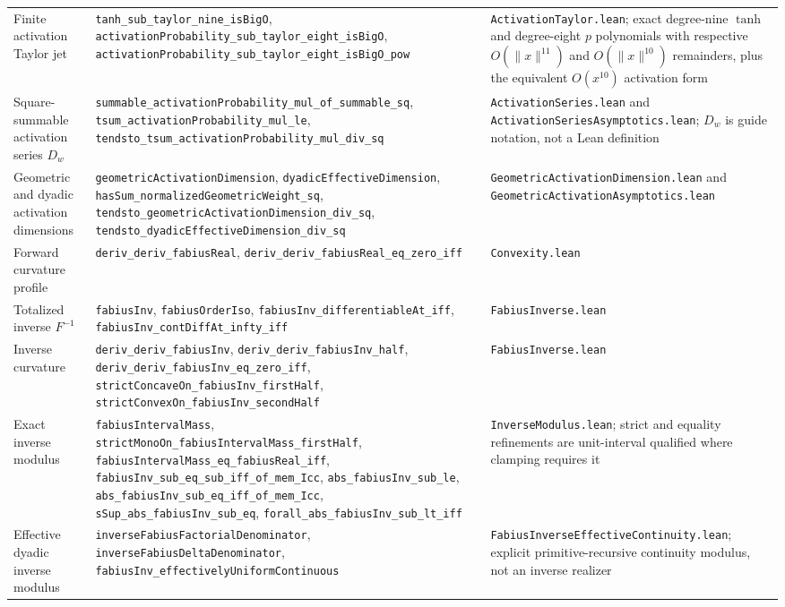 \documentclass[11pt,oneside]{article}
\theoremstyle{definition}
\theoremstyle{remark}
\begin{document}
\begin{longtable}{@{}>{\raggedright\arraybackslash}p{} >{\raggedright\arraybackslash}p{} >{\raggedright\arraybackslash}p{}@{}}
Finite activation Taylor jet & \nolinkurl{tanh_sub_taylor_nine_isBigO}, \nolinkurl{activationProbability_sub_taylor_eight_isBigO}, \nolinkurl{activationProbability_sub_taylor_eight_isBigO_pow} & \nolinkurl{ActivationTaylor.lean}; exact degree-nine \(\tanh\) and degree-eight \(p\) polynomials with respective \(O(\lVert x\rVert^{11})\) and \(O(\lVert x\rVert^{10})\) remainders, plus the equivalent \(O(x^{10})\) activation form \\
Square-summable activation series \(D_w\) & \nolinkurl{summable_activationProbability_mul_of_summable_sq}, \nolinkurl{tsum_activationProbability_mul_le}, \nolinkurl{tendsto_tsum_activationProbability_mul_div_sq} & \nolinkurl{ActivationSeries.lean} and \nolinkurl{ActivationSeriesAsymptotics.lean}; \(D_w\) is guide notation, not a Lean definition \\
Geometric and dyadic activation dimensions & \nolinkurl{geometricActivationDimension}, \nolinkurl{dyadicEffectiveDimension}, \nolinkurl{hasSum_normalizedGeometricWeight_sq}, \nolinkurl{tendsto_geometricActivationDimension_div_sq}, \nolinkurl{tendsto_dyadicEffectiveDimension_div_sq} & \nolinkurl{GeometricActivationDimension.lean} and \nolinkurl{GeometricActivationAsymptotics.lean} \\
Forward curvature profile & \nolinkurl{deriv_deriv_fabiusReal}, \nolinkurl{deriv_deriv_fabiusReal_eq_zero_iff} & \nolinkurl{Convexity.lean} \\
Totalized inverse \(F^{-1}\) & \nolinkurl{fabiusInv}, \nolinkurl{fabiusOrderIso}, \nolinkurl{fabiusInv_differentiableAt_iff}, \nolinkurl{fabiusInv_contDiffAt_infty_iff} & \nolinkurl{FabiusInverse.lean} \\
Inverse curvature & \nolinkurl{deriv_deriv_fabiusInv}, \nolinkurl{deriv_deriv_fabiusInv_half}, \nolinkurl{deriv_deriv_fabiusInv_eq_zero_iff}, \nolinkurl{strictConcaveOn_fabiusInv_firstHalf}, \nolinkurl{strictConvexOn_fabiusInv_secondHalf} & \nolinkurl{FabiusInverse.lean} \\
Exact inverse modulus & \nolinkurl{fabiusIntervalMass}, \nolinkurl{strictMonoOn_fabiusIntervalMass_firstHalf}, \nolinkurl{fabiusIntervalMass_eq_fabiusReal_iff}, \nolinkurl{fabiusInv_sub_eq_sub_iff_of_mem_Icc}, \nolinkurl{abs_fabiusInv_sub_le}, \nolinkurl{abs_fabiusInv_sub_eq_iff_of_mem_Icc}, \nolinkurl{sSup_abs_fabiusInv_sub_eq}, \nolinkurl{forall_abs_fabiusInv_sub_lt_iff} & \nolinkurl{InverseModulus.lean}; strict and equality refinements are unit-interval qualified where clamping requires it \\
Effective dyadic inverse modulus & \nolinkurl{inverseFabiusFactorialDenominator}, \nolinkurl{inverseFabiusDeltaDenominator}, \nolinkurl{fabiusInv_effectivelyUniformContinuous} & \nolinkurl{FabiusInverseEffectiveContinuity.lean}; explicit primitive-recursive continuity modulus, not an inverse realizer \\

\end{longtable}
\end{document}
